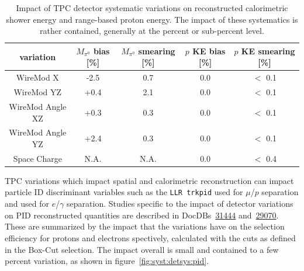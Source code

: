 \begin{table}[H]
\centering
\setlength{\tabcolsep}{10pt}
\renewcommand{\arraystretch}{1.25}
 \begin{tabular}{| c | c | c | c | c |} 
 \hline
 variation & $M_{\pi^0}$ bias [\%] & $M_{\pi^0}$ smearing [\%] & $p$ KE bias [\%] & $p$ KE smearing [\%]  \\
 \hline
WireMod X & -2.5 & 0.7 & 0.0 & $<$ 0.1 \\
WireMod YZ & +0.4 & 2.1 & 0.0 & $<$ 0.1 \\
WireMod Angle XZ & +0.3 & 0.3 & 0.0 & $<$ 0.1 \\
WireMod Angle YZ & +2.4 & 0.3 & 0.0 & $<$ 0.1 \\
Space Charge & N.A. & N.A. & 0.0 & $<$ 0.4 \\
 \hline
 \end{tabular}
 \caption{\label{tab:energyvar} Impact of TPC detector systematic variations on reconstructed calorimetric shower energy and range-based proton energy. The impact of these systematics is rather contained, generally at the percent or sub-percent level.}
\end{table}


TPC variations which impact spatial and calorimetric reconstruction can impact particle ID discriminant variables such as the \texttt{LLR trkpid} used for $\mu$/$p$ separation and \dedx used for $e$/$\gamma$ separation. Studies specific to the impact of detector variations on PID reconstructed quantities are described in DocDBs~\href{https://microboone-docdb.fnal.gov/cgi-bin/private/ShowDocument?docid=31444}{31444} and~\href{https://microboone-docdb.fnal.gov/cgi-bin/private/ShowDocument?docid=29070}{29070}. These are summarized by the impact that the variations have on the selection efficiency for protons and electrons spectively, calculated with the cuts as defined in the \npsel Box-Cut selection. The impact overall is small and contained to a few percent variation, as shown in figure~\ref{fig:syst:detsys:pid}.

